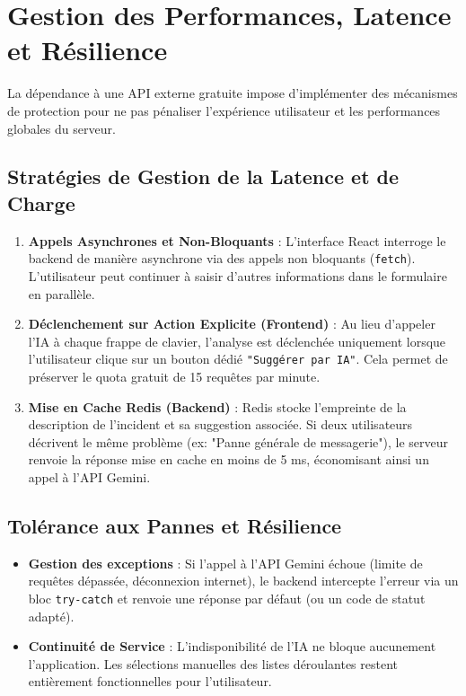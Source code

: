 \documentclass[12pt,a4paper]{article}
\begin{document}
\newpage
\section{Gestion des Performances, Latence et Résilience}
La dépendance à une API externe gratuite impose d'implémenter des mécanismes de protection pour ne pas pénaliser l'expérience utilisateur et les performances globales du serveur.

\subsection{Stratégies de Gestion de la Latence et de Charge}
\begin{enumerate}
    \item \textbf{Appels Asynchrones et Non-Bloquants} : L'interface React interroge le backend de manière asynchrone via des appels non bloquants (\texttt{fetch}). L'utilisateur peut continuer à saisir d'autres informations dans le formulaire en parallèle.
    \item \textbf{Déclenchement sur Action Explicite (Frontend)} : Au lieu d'appeler l'IA à chaque frappe de clavier, l'analyse est déclenchée uniquement lorsque l'utilisateur clique sur un bouton dédié \texttt{"Suggérer par IA"}. Cela permet de préserver le quota gratuit de 15 requêtes par minute.
    \item \textbf{Mise en Cache Redis (Backend)} : Redis stocke l'empreinte de la description de l'incident et sa suggestion associée. Si deux utilisateurs décrivent le même problème (ex: "Panne générale de messagerie"), le serveur renvoie la réponse mise en cache en moins de 5 ms, économisant ainsi un appel à l'API Gemini.
\end{enumerate}

\subsection{Tolérance aux Pannes et Résilience}
\begin{itemize}
    \item \textbf{Gestion des exceptions} : Si l'appel à l'API Gemini échoue (limite de requêtes dépassée, déconnexion internet), le backend intercepte l'erreur via un bloc \texttt{try-catch} et renvoie une réponse par défaut (ou un code de statut adapté).
    \item \textbf{Continuité de Service} : L'indisponibilité de l'IA ne bloque aucunement l'application. Les sélections manuelles des listes déroulantes restent entièrement fonctionnelles pour l'utilisateur.
\end{itemize}
\end{document}
